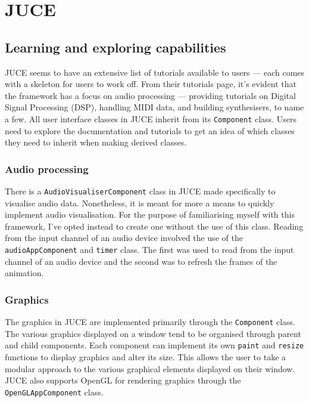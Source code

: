\documentclass[../main_frameworkreview.tex]{subfiles}
\begin{document}
\section{JUCE}

\subsection{Learning and exploring capabilities}
JUCE seems to have an extensive list of tutorials available to users --- each comes with a skeleton for users to work off.\cite{JUCETutorials} From their tutorials page, it's evident that the framework has a focus on audio processing --- providing tutorials on Digital Signal Processing (DSP), handling MIDI data, and building synthesisers, to name a few. All user interface classes in JUCE inherit from its \verb|Component| class. Users need to explore the documentation and tutorials to get an idea of which classes they need to inherit when making derived classes. %
\subsubsection{Audio processing}
There is a \verb|AudioVisualiserComponent| class in JUCE made specifically to visualise audio data. Nonetheless, it is meant for more a means to quickly implement audio visualisation.\cite{JUCEAudioVisDoc} For the purpose of familiarising myself with this framework, I've opted instead to create one without the use of this class. Reading from the input channel of an audio device involved the use of the \verb|audioAppComponent| and \verb|timer| class. The first was used to read from the input channel of an audio device and the second was to refresh the frames of the animation.
\subsubsection{Graphics}
The graphics in JUCE are implemented primarily through the \verb|Component| class. The various graphics displayed on a window tend to be organised through parent and child components. Each component can implement its own \verb|paint| and \verb|resize| functions to display graphics and alter its size.\cite{JUCECompDoc} This allows the user to take a modular approach to the various graphical elements displayed on their window. JUCE also supports OpenGL for rendering graphics through the \verb|OpenGLAppComponent| class.
\end{document}

